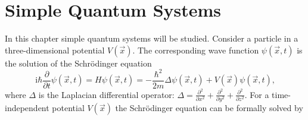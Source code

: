\documentclass[10pt,a4paper]{article} %
\renewcommand{\i}{{\mathrm{i}}}
\begin{document}
    \title{\rmfamily\normalfont{}}
    \author{}
    \date{01.10.15} %
    	
    
    \maketitle
    
    \begin{abstract}
      Applying numerical methods in quantum mechanics has always been necessary in analysing complex structures of quantum mechanical systems. The technical progress of computer performance has enabled physicists and mathematicians to simulate complex many-body systems. With these methods tangible progress in quantum physics can be made, to analyse quantum phenomena on the level of many-particle interactions. This article focuses on the implementation of numerical methods for many-body simulation in the functional programming language \textbf{Haskell}. Functional programming languages get more and more interesting for physicists through their mathematical way of implementation. In this article simple quantum systems are simulated first and an overview of different numerical methods for solving the Schrödinger equation will be given following an attempt to proceed to many-body systems from simple quantum systems. 
    \end{abstract}
       
    \tableofcontents
    
    \section{Simple Quantum Systems}\label{1}
   In this chapter simple quantum systems will be studied. Consider a particle in a three-dimensional potential $V(\vec{x})$. The corresponding wave function $\psi(\vec{x}, t)$ is the solution of the Schrödinger equation
   \begin{equation}
  \i \hbar \frac{\partial}{\partial t} \psi(\vec{x}, t) = H \psi(\vec{x}, t) = - \frac{\hbar^2}{2m}	\Delta \psi(\vec{x}, t)+  V(\vec{x}) \psi(\vec{x}, t) \text{,}
   \end{equation}
   where $\Delta$ is the Laplacian differential operator: $\Delta = \frac{\partial^2}{\partial x^2} +\frac{\partial^2}{\partial y^2} + \frac{\partial^2}{\partial z^2} $. For a time-independent potential $V(\vec{x})$ the Schrödinger equation can be formally solved by 
   
\end{document}
